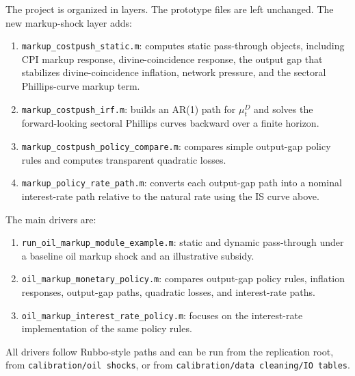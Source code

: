\documentclass[11pt]{article}
\begin{document}
The project is organized in layers. The prototype files are left unchanged. The new
markup-shock layer adds:
\begin{enumerate}
    \item \texttt{markup\_costpush\_static.m}: computes static pass-through objects,
    including CPI markup response, divine-coincidence response, the output gap that
    stabilizes divine-coincidence inflation, network pressure, and the sectoral
    Phillips-curve markup term.
    \item \texttt{markup\_costpush\_irf.m}: builds an AR(1) path for $\mu_t^D$ and
    solves the forward-looking sectoral Phillips curves backward over a finite horizon.
    \item \texttt{markup\_costpush\_policy\_compare.m}: compares simple output-gap
    policy rules and computes transparent quadratic losses.
    \item \texttt{markup\_policy\_rate\_path.m}: converts each output-gap path into a
    nominal interest-rate path relative to the natural rate using the IS curve above.
\end{enumerate}
The main drivers are:
\begin{enumerate}
    \item \texttt{run\_oil\_markup\_module\_example.m}: static and dynamic pass-through
    under a baseline oil markup shock and an illustrative subsidy.
    \item \texttt{oil\_markup\_monetary\_policy.m}: compares output-gap policy rules,
    inflation responses, output-gap paths, quadratic losses, and interest-rate paths.
    \item \texttt{oil\_markup\_interest\_rate\_policy.m}: focuses on the interest-rate
    implementation of the same policy rules.
\end{enumerate}
All drivers follow Rubbo-style paths and can be run from the replication root, from
\texttt{calibration/oil shocks}, or from \texttt{calibration/data cleaning/IO tables}.
\end{document}

